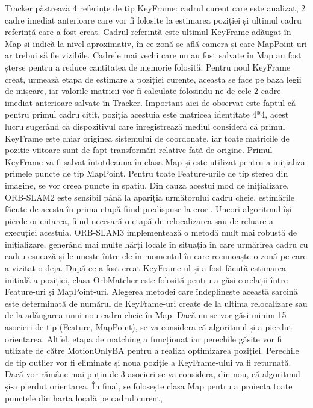 \documentclass[12pt,a4paper]{report}
\begin{document}
Tracker păstrează 4 referințe de tip KeyFrame: cadrul curent care este analizat, 2 cadre imediat 
anterioare care vor fi folosite la estimarea poziției și ultimul cadru referință care a fost creat.
Cadrul referință este ultimul KeyFrame adăugat în Map și indică la nivel aproximativ, în ce 
zonă se află camera și care MapPoint-uri ar trebui să fie vizibile. Cadrele mai vechi care nu au 
fost salvate în Map au fost șterse pentru a reduce cantitatea de memorie folosită. Pentru noul
KeyFrame creat, urmează etapa de estimare a poziției curente, aceasta se face pe baza legii 
de mișcare, iar valorile matricii vor fi calculate folosindu-ne de cele 2 cadre imediat anterioare salvate în Tracker.
Important aici de observat este faptul că pentru primul cadru citit, poziția acestuia este matricea identitate
4*4, acest lucru sugerând că dispozitivul care înregistrează mediul consideră că primul KeyFrame
este chiar originea sistemului de coordonate, iar toate matricile de poziție viitoare sunt de fapt
transformări relative față de origine. Primul KeyFrame va fi salvat întotdeauna în clasa Map și 
este utilizat pentru a inițializa primele puncte de tip MapPoint. Pentru toate Feature-urile de 
tip stereo din imagine, se vor creea puncte în spatiu. Din cauza acestui mod de inițializare, 
ORB-SLAM2 este sensibil până la apariția următorului cadru cheie, estimările făcute de acesta 
în prima etapă fiind predispuse la erori. Uneori algoritmul își pierde orientarea, fiind
necesară o etapă de relocalizarea sau de reluare a execuției acestuia. ORB-SLAM3 implementează 
o metodă mult mai robustă de inițializare, generând mai multe hărți locale în situația în care
urmărirea cadru cu cadru eșuează și le unește între ele în momentul în care recunoaște o zonă pe 
care a vizitat-o deja. După ce a fost creat KeyFrame-ul și a fost făcută estimarea inițială a 
poziției, clasa OrbMatcher este folosită pentru a găsi corelații între Feature-uri și MapPoint-uri.
Alegerea metodei care îndeplinește această sarcină este determinată de numărul de KeyFrame-uri 
create de la ultima relocalizare sau de la adăugarea unui nou cadru cheie în Map. Dacă nu se 
vor găsi minim 15 asocieri de tip (Feature, MapPoint), se va considera că algoritmul și-a pierdut orientarea.
Altfel, etapa de matching a funcționat iar perechile găsite vor fi utlizate de către MotionOnlyBA pentru a realiza optimizarea poziției.
Perechile de tip outlier vor fi eliminate și noua poziție a KeyFrame-ului va fi returnată. Dacă 
vor rămâne mai puțin de 3 asocieri se va considera, din nou, că algoritmul și-a pierdut orientarea.
În final, se folosește clasa Map pentru a proiecta toate punctele din harta locală pe cadrul curent,
\end{document}
